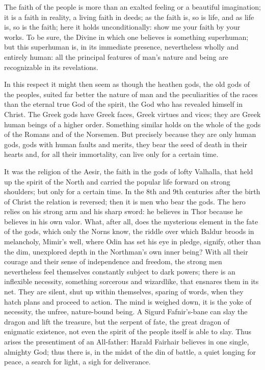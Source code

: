 \documentclass[12pt,a4paper,openany]{book}
\newcommand{\opage}[1]{\marginnote{\footnotesize\textit{[#1]}}}
\begin{document}
The faith of the people is more than an exalted feeling or
a beautiful imagination; it is a faith in reality, a
living faith in deeds; as the faith is, so is life,
and as life is, so is the faith; here it holds
unconditionally: show me your faith by your works. To be sure,
the Divine in which one believes is something
\setcounter{footnote}{0}%
\opage{71}superhuman; but this superhuman is, in its
immediate presence, nevertheless wholly and entirely human:
all the principal features of man's nature and being
are recognizable in its revelations.

In this respect it might then seem as though
the heathen gods, the old gods of the peoples, suited
far better the nature of man and the peculiarities
of the races than the eternal true God of the spirit, the
God who has revealed himself in Christ. The Greek
gods have Greek faces, Greek virtues and vices;
they are Greek human beings of a higher order. Something similar
holds on the whole of the gods of the Romans and of the Norsemen.
But precisely because they are only human gods,
gods with human faults and merits, they bear
the seed of death in their hearts and, for all their immortality, can
live only for a certain time.

It was the religion of the Aesir, the faith in the gods of lofty Valhalla,
that held up the spirit of the North and carried the popular life forward
on strong shoulders; but only for a certain time. In the 8th
and 9th centuries after the birth of Christ the relation is
reversed; then it is men who bear the gods.
The hero relies on his strong arm and his sharp sword:
he believes in Thor because he believes in his own
valor. What, after all, does the mysterious element
in the fate of the gods, which only the Norns know, the riddle
over which Baldur broods in melancholy, Mimir's well,
where Odin has set his eye in pledge, signify, other than the
dim, unexplored depth in the Northman's own inner being? With
all their courage and their sense of independence and freedom, the
strong men nevertheless feel themselves constantly subject to dark
powers; there is an inflexible necessity, something sorcerous
and wizardlike, that ensnares them in its net.
\setcounter{footnote}{0}%
\opage{72}They are silent, shut up within themselves, sparing of words, when they hatch
plans and proceed to action. The mind is weighed down, it
is the yoke of necessity, the unfree, nature-bound being.
A Sigurd Fafnir's-bane can slay the dragon and lift
the treasure, but the serpent of fate, the great dragon of
enigmatic existence, not even the spirit of the people
itself is able to slay. Thus arises the presentiment of an All-father:
Harald Fairhair believes in one single, almighty God;
thus there is, in the midst of the din of battle, a quiet longing
for peace, a search for light, a sigh for deliverance.
\end{document}
